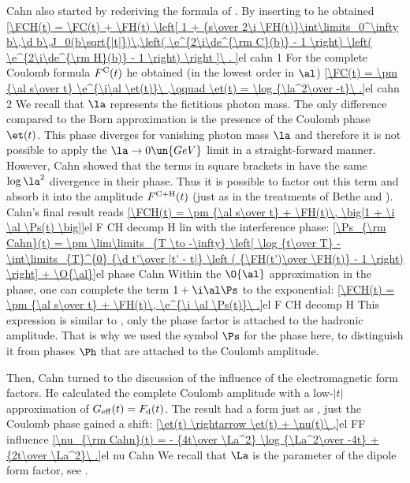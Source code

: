 Cahn  also started by rederiving the formula of \WY. By inserting  to  he obtained
\eqref{\FCH(t) = \FC(t)
+ \FH(t) \left[ 1 +
{s\over 2\i \FH(t)}\int\limits_0^\infty b\,\d b\,J_0(b\sqrt{|t|})\,\left( \e^{2\i\de^{\rm C}(b)} - 1 \right) \left( \e^{2\i\de^{\rm H}(b)} - 1 \right)
\right ]\ .
}{el cahn 1}
For the complete Coulomb formula $F^{\rm C}(t)$ he obtained (in the lowest order in $\al$)
\eqref{\FC(t) = \pm {\al s\over t} \e^{\i\al \et(t)}\ ,\qquad \et(t) = \log {\la^2\over -t}\ .}{el cahn 2}
We recall that $\la$ represents the fictitious photon mass. The only difference compared to the Born approximation  is the presence of the Coulomb phase $\et(t)$. This phase diverges for vanishing photon mass $\la$ and therefore it is not possible to apply the $\la\to 0\un{GeV}$ limit in a straight-forward manner. However, Cahn showed that the terms in square brackets in  have the same $\log\la^2$ divergence in their phase. Thus it is possible to factor out this term and absorb it into the amplitude $F^{\rm C+H}(t)$ (just as in the treatments of Bethe and \WY). Cahn's final result reads
\eqref{\FCH(t) = \pm {\al s\over t} + \FH(t)\, \big[1 + \i \al \Ps(t) \big]}{el F CH decomp H lin}
with the interference phase:
\eqref{\Ps_{\rm Cahn}(t) = \pm \lim\limits_{T \to -\infty} \left[ \log {t\over T} - \int\limits_{T}^{0} {\d t'\over |t' - t|} \left ( {\FH(t')\over \FH(t)} - 1 \right) \right] + \O{\al}}{el phase Cahn}
Within the $\O{\al}$ approximation in the phase, one can complete the term $1+\i\al\Ps$ to the exponential:
\eqref{\FCH(t) = \pm {\al s\over t} + \FH(t)\, \e^{\i \al \Ps(t)}\ .}{el F CH decomp H}
This expression is similar to , only the phase factor is attached to the hadronic amplitude. That is why we used the symbol $\Ps$ for the phase here, to distinguish it from phases $\Ph$ that are attached to the Coulomb amplitude.

Then, Cahn turned to the discussion of the influence of the electromagnetic form factors. He calculated the complete Coulomb amplitude with a low-$|t|$ approximation of $G_{\rm eff}(t) = F_{\rm d}(t)$. The result had a form just as , just the Coulomb phase gained a shift:
\eqref{\et(t) \rightarrow \et(t) + \nu(t)\ ,}{el FF influence}
\eqref{\nu_{\rm Cahn}(t) = - {4t\over \La^2} \log {\La^2\over -4t} + {2t\over \La^2}\ .}{el nu Cahn}
We recall that $\La$ is the parameter of the dipole form factor, see .

